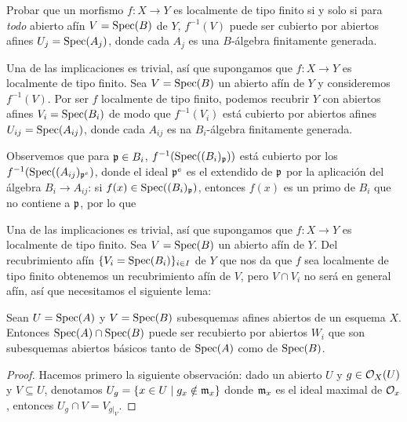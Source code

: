 \documentclass[twoside]{article}
\begin{document}
\begin{ejercicio}{3.1}
Probar que un morfismo $f:X\to Y$ es localmente de tipo finito si y solo si para \emph{todo} abierto afín $V=\operatorname{Spec}(B)$ de $Y$, $f^{-1}(V)$ puede ser cubierto por abiertos afines $U_j=\operatorname{Spec}(A_j)$, donde cada $A_j$ es una $B$-álgebra finitamente generada. 
\end{ejercicio}
\begin{solucion}
Una de las implicaciones es trivial, así que supongamos que $f:X\to Y$ es localmente de tipo finito. Sea $V=\operatorname{Spec}(B)$ un abierto afín de $Y$ y consideremos $f^{-1}(V)$. Por ser $f$ localmente de tipo finito, podemos recubrir $Y$ con abiertos afines $V_i=\operatorname{Spec}(B_i)$ de modo que $f^{-1}(V_i)$ está cubierto por abiertos afines $U_{ij}=\operatorname{Spec}(A_{ij})$, donde cada $A_{ij}$ es na $B_i$-álgebra finitamente generada. %

Observemos que para $\mathfrak{p}\in B_i$, $f^{-1}(\operatorname{Spec}((B_i)_{\mathfrak{p}}))$ está cubierto por los $f^{-1}(\operatorname{Spec}((A_{ij})_{\mathfrak{p}^e})$, donde el ideal $\mathfrak{p}^e$ es el extendido de $\mathfrak{p}$ por la aplicación del álgebra $B_i\to A_{ij}$: si $f(x)\in\operatorname{Spec}((B_i)_{\mathfrak{p}})$, entonces $f(x)$ es un primo de $B_i$ que no contiene a $\mathfrak{p}$, por lo que 

%
%
%
%

Una de las implicaciones es trivial, así que supongamos que $f:X\to Y$ es localmente de tipo finito. Sea $V=\operatorname{Spec}(B)$ un abierto afín de $Y$. Del recubrimiento afín $\{V_i=\operatorname{Spec}(B_i)\}_{i\in I}$ de $Y$ que nos da que $f$ sea localmente de tipo finito obtenemos un recubrimiento afín de $V$, pero $V\cap V_i$ no será en general afín, así que necesitamos el siguiente lema:

\begin{lemma}
Sean $U=\operatorname{Spec}(A)$ y $V=\operatorname{Spec}(B)$ subesquemas afines abiertos de un esquema $X$. Entonces $\operatorname{Spec}(A)\cap\operatorname{Spec}(B)$ puede ser recubierto por abiertos $W_i$ que son subesquemas abiertos básicos tanto de $\operatorname{Spec}(A)$ como de $\operatorname{Spec}(B)$.
\end{lemma}
\begin{proof}
Hacemos primero la siguiente observación: dado un abierto $U$ y $g\in{\mathcal O}_X(U)$ y $V\subseteq U$, denotamos $U_g=\{x\in U\mid g_x\notin \mathfrak{m}_x\}$ donde $\mathfrak{m}_x$ es el ideal maximal de ${\mathcal O}_x$, entonces $U_g\cap V=V_{g|_V}$. 


\end{proof}
\end{solucion}
\end{document}
